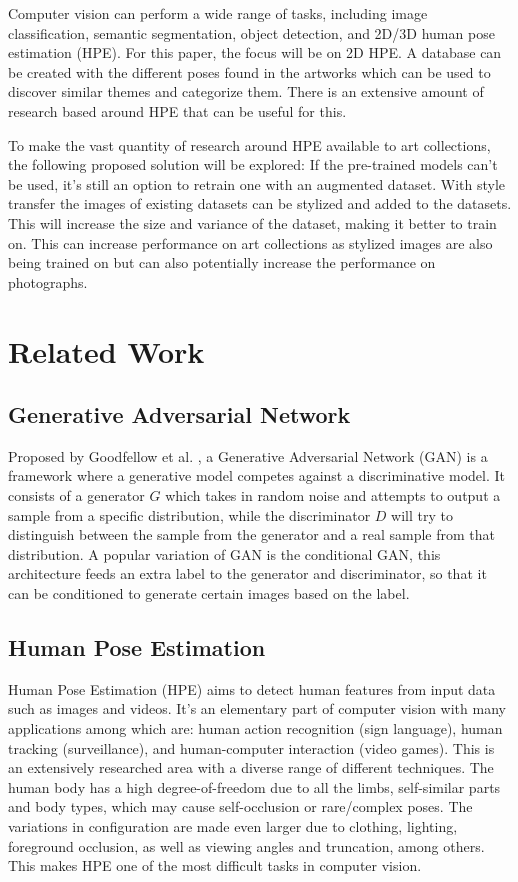 \documentclass[conference]{IEEEtran}
\begin{document}
Computer vision can perform a wide range of tasks, including image classification, semantic segmentation, object detection, and 2D/3D human pose estimation (HPE).
For this paper, the focus will be on 2D HPE.
A database can be created with the different poses found in the artworks which can be used to discover similar themes and categorize them.
There is an extensive amount of research based around HPE that can be useful for this.

To make the vast quantity of research around HPE available to art collections, the following proposed solution will be explored:
If the pre-trained models can't be used, it's still an option to retrain one with an augmented dataset.
With style transfer the images of existing datasets can be stylized and added to the datasets.
This will increase the size and variance of the dataset, making it better to train on.
This can increase performance on art collections as stylized images are also being trained on but can also potentially increase the performance on photographs.

\section{Related Work}
\subsection{Generative Adversarial Network}
Proposed by Goodfellow et al. \cite{Goodfellow2014}, a Generative Adversarial Network (GAN) is a framework where a generative model competes against a discriminative model.
It consists of a generator $G$ which takes in random noise and attempts to output a sample from a specific distribution, while the discriminator $D$ will try to distinguish between the sample from the generator and a real sample from that distribution.
A popular variation of GAN is the conditional GAN, this architecture feeds an extra label to the generator and discriminator, so that it can be conditioned to generate certain images based on the label.

\subsection{Human Pose Estimation}
Human Pose Estimation (HPE) aims to detect human features from input data such as images and videos.
It's an elementary part of computer vision with many applications among which are: human action recognition (sign language), human tracking (surveillance), and human-computer interaction (video games).
This is an extensively researched area with a diverse range of different techniques.
The human body has a high degree-of-freedom due to all the limbs, self-similar parts and body types, which may cause self-occlusion or rare/complex poses.
The variations in configuration are made even larger due to clothing, lighting, foreground occlusion, as well as viewing angles and truncation, among others.
This makes HPE one of the most difficult tasks in computer vision.
\end{document}
